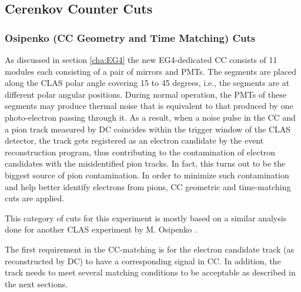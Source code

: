 \subsection{Cerenkov Counter Cuts}
\subsubsection{ Osipenko (CC Geometry and Time Matching) Cuts}
\label{osiCuts}
As discussed in section \ref{cha:EG4}%
the new EG4-dedicated CC consists of 11 modules %
each consisting of a pair %
of mirrors and PMTs. The segments are placed along the CLAS polar angle covering 15 to 45 degrees, i.e., the segments are at different polar angular positions. %
During normal operation, the PMTs of these segments may produce %
thermal noise that is equivalent to that produced by one photo-electron passing through it. As a result, when a noise pulse in the CC and a pion track measured by DC coincides within the trigger window of the CLAS detector, %
the track gets registered as an electron candidate by the event reconstruction program, thus contributing to the contamination of electron candidates %
with the misidentified pion tracks. In fact, this turns out to be the biggest source of pion contamination. In order to minimize such contamination and help better identify electrons from pions, %
CC geometric and time-matching cuts are applied.

This category of cuts for this experiment is %
mostly based on a similar analysis done for another CLAS experiment by M. Osipenko \cite{cnOsipenko}.%


The first requirement in the CC-matching is for the electron candidate track (as reconstructed by DC) to have a corresponding signal in CC. In addition, the track needs to meet several %
matching conditions to be acceptable as described in the next sections.


